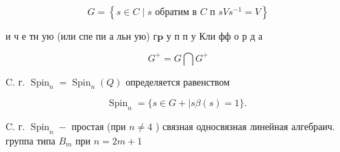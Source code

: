 \documentclass[10pt]{article}
\begin{document}
\[

G=\left\{s \in C \mid s \text { обратим в } C \text { п } s V s^{-1}=V\right\}

\]



и ч е тн ую (или спе пи а льн ую) $г \mathbf{p}$ у п п у Кли фф о р д а



\[

G^{+}=G \bigcap G^{+}

\]



C. г. $\operatorname{Spin}_{n}=\operatorname{Spin}_{n}(Q)$ определяется равенством



\[

\operatorname{Spin}_{n}=\{s \in G+\mid s \beta(s)=1\} \text {. }

\]



C. г. $\operatorname{Spin}_{n}-$ простая (при $n \neq 4$ ) связная односвязная линейная алгебраич. группа типа $B_{m}$ при $n=2 m+1$
\end{document}
